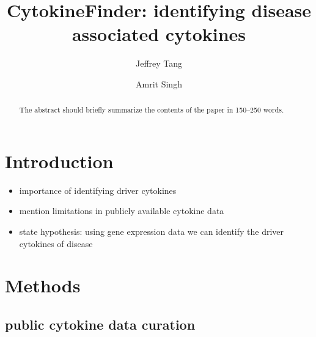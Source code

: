 \documentclass[runningheads]{llncs}
\providecommand{\tightlist}{%
  \setlength{\itemsep}{0pt}\setlength{\parskip}{0pt}}
\begin{document}
\title{CytokineFinder: identifying disease associated cytokines}
%
%
\author{Jeffrey Tang \and Amrit
Singh}


%


\maketitle              %
%
\begin{abstract}
The abstract should briefly summarize the contents of the paper in
150--250 words.


\end{abstract}

\hypertarget{introduction}{%
\section{Introduction}\label{introduction}}

\begin{itemize}
\tightlist
\item
  importance of identifying driver cytokines
\item
  mention limitations in publicly available cytokine data
\item
  state hypothesis: using gene expression data we can identify the
  driver cytokines of disease
\end{itemize}

\hypertarget{methods}{%
\section{Methods}\label{methods}}

\hypertarget{public-cytokine-data-curation}{%
\subsection{public cytokine data
curation}\label{public-cytokine-data-curation}}
\end{document}
